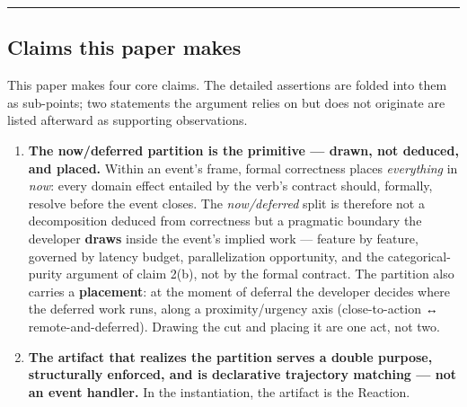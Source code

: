 \documentclass[
]{article}
\begin{document}
\begin{center}\rule{0.5\linewidth}{0.5pt}\end{center}

\subsection{Claims this paper makes}\label{claims-this-paper-makes}

This paper makes four core claims. The detailed assertions are folded
into them as sub-points; two statements the argument relies on but does
not originate are listed afterward as supporting observations.

\begin{enumerate}
\def\labelenumi{\arabic{enumi}.}
\item
  \textbf{The now/deferred partition is the primitive --- drawn, not
  deduced, and placed.} Within an event's frame, formal correctness
  places \emph{everything} in \emph{now}: every domain effect entailed
  by the verb's contract should, formally, resolve before the event
  closes. The \emph{now/deferred} split is therefore not a decomposition
  deduced from correctness but a pragmatic boundary the developer
  \textbf{draws} inside the event's implied work --- feature by feature,
  governed by latency budget, parallelization opportunity, and the
  categorical-purity argument of claim 2(b), not by the formal contract.
  The partition also carries a \textbf{placement}: at the moment of
  deferral the developer decides where the deferred work runs, along a
  proximity/urgency axis (close-to-action ↔ remote-and-deferred).
  Drawing the cut and placing it are one act, not two.
\item
  \textbf{The artifact that realizes the partition serves a double
  purpose, structurally enforced, and is declarative trajectory matching
  --- not an event handler.} In the instantiation, the artifact is the
  Reaction.


\end{enumerate}
\end{document}

